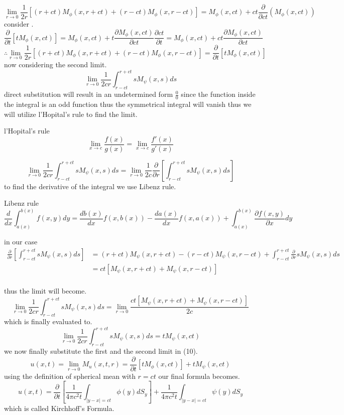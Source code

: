 \[
    \lim_{r\to 0}\frac{1}{2r}\left[(r+ct)M_\phi(x,r+ct)+(r-ct)M_\phi(x,r-ct)\right] = M_\phi(x,ct) + ct\frac{\partial}{\partial ct}(M_\phi(x,ct))    
\]
consider .
\[
    \frac{\partial}{\partial t}[tM_\phi(x,ct)] = M_\phi(x,ct)+t \frac{\partial M_\phi(x,ct)}{\partial ct}\frac{\partial ct}{\partial t} = M_\phi(x,ct)+ct \frac{\partial M_\phi(x,ct)}{\partial ct}    
\]
\[
\therefore \lim_{r\to 0}\frac{1}{2r}\left[(r+ct)M_\phi(x,r+ct)+(r-ct)M_\phi(x,r-ct)\right] = \frac{\partial}{\partial t}[tM_\phi(x,ct)]    
\]
now considering the second limit.
\[
    \lim_{r\to 0}\frac{1}{2cr}\int_{r-ct}^{r+ct} sM_\psi(x,s)ds    
\]
direct substitution will result in an undetermined form $\frac{0}{0}$ since the function inside the integral is an odd function thus the symmetrical integral will vanish thus we will utilize l'Hopital's rule to find the limit.
\begin{enrichment*}{l'Hopital's rule}
    \[
        \lim_{{x \to c}} \frac{{f(x)}}{{g(x)}} = \lim_{{x \to c}} \frac{{f'(x)}}{{g'(x)}}    
    \]
\end{enrichment*}
\[
    \lim_{r\to 0}\frac{1}{2cr}\int_{r-ct}^{r+ct} sM_\psi(x,s)ds = \lim_{r\to 0}\frac{1}{2c}\frac{\partial}{\partial r}\left[\int_{r-ct}^{r+ct} sM_\psi(x,s)ds\right]    
\]
to find the derivative of the integral we use Libenz rule.
\begin{enrichment*}{Libenz rule}
    \[
        \frac{d}{dx}\int_{a(x)}^{b(x)} f(x,y)dy = \frac{db(x)}{dx}f(x,b(x))-\frac{da(x)}{dx}f(x,a(x)) + \int_{a(x)}^{b(x)} \frac{\partial f(x,y)}{\partial x} dy    
    \]
\end{enrichment*}
in our case
\begin{align*}
\frac{\partial}{\partial r}\left[\int_{r-ct}^{r+ct} sM_\psi(x,s)ds\right] &= (r+ct)M_\psi(x,r+ct) - (r-ct)M_\psi(x,r-ct) + \int_{r-ct}^{r+ct} \frac{\partial}{\partial r} sM_\psi(x,s)ds
\\
 &= ct[M_\psi(x,r+ct)+M_\psi(x,r-ct)]
\end{align*}
\\
thus the limit will become.
\[
    \lim_{r\to 0}\frac{1}{2cr}\int_{r-ct}^{r+ct} sM_\psi(x,s)ds = \lim_{r\to 0}\frac{ct[M_\psi(x,r+ct)+M_\psi(x,r-ct)]}{2c}    
\]
which is finally evaluated to.
\[
    \lim_{r\to 0}\frac{1}{2cr}\int_{r-ct}^{r+ct} sM_\psi(x,s)ds = tM_\psi(x,ct)    
\]
we now finally substitute the first and the second limit in (10).
\[
    u(x,t) = \lim_{r\to 0} M_u(x,t,r) = \frac{\partial}{\partial t}[tM_\phi(x,ct)] + tM_\psi(x,ct)    
\]
using the definition of spherical mean with $r=ct$ our final formula becomes.
\[
    u(x,t) = \frac{\partial}{\partial t}\left[\frac{1}{4\pi c^2 t}\int_{|y-x|=ct}\phi(y)dS_y\right] + \frac{1}{4\pi c^2 t}\int_{|y-x|=ct}\psi(y)dS_y    
\]
which is called Kirchhoff's Formula.

